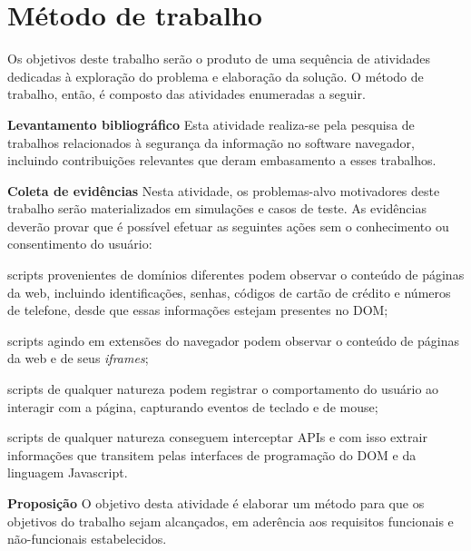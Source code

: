 \section{Método de trabalho}


Os objetivos deste trabalho serão o produto de uma sequência de atividades dedicadas à exploração do problema e elaboração da solução. O método de trabalho, então, é composto das atividades enumeradas a seguir.


\begin{alineas}
	\item \textbf{Levantamento bibliográfico}
	Esta atividade realiza-se pela pesquisa de trabalhos relacionados à segurança da informação no software navegador, incluindo contribuições relevantes que deram embasamento a esses trabalhos.
	
	\item \textbf{Coleta de evidências}
	Nesta atividade, os problemas-alvo motivadores deste trabalho serão materializados em simulações e casos de teste. As evidências deverão provar que é possível efetuar as seguintes ações sem o conhecimento ou consentimento do usuário:
	
	\begin{alineas}
		\item scripts provenientes de domínios diferentes podem observar o conteúdo de páginas da web, incluindo identificações, senhas, códigos de cartão de crédito e números de telefone, desde que essas informações estejam presentes no DOM;
		\item scripts agindo em extensões do navegador podem observar o conteúdo de páginas da web e de seus \textit{iframes};
		\item scripts de qualquer natureza podem registrar o comportamento do usuário ao interagir com a página, capturando eventos de teclado e de mouse;
		\item scripts de qualquer natureza conseguem interceptar APIs e com isso extrair informações que transitem pelas interfaces de programação do DOM e da linguagem Javascript.
	\end{alineas}
	
	\item \textbf{Proposição}
	O objetivo desta atividade é elaborar um método para que os objetivos do trabalho sejam alcançados, em aderência aos requisitos funcionais e não-funcionais estabelecidos.


\end{alineas}
